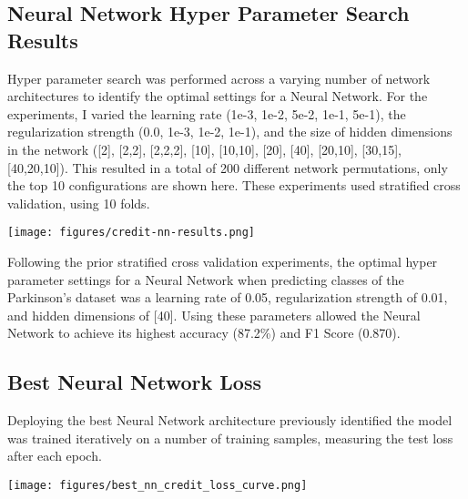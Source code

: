 \documentclass[letterpaper]{article}
\begin{document}
\subsection{Neural Network Hyper Parameter Search Results}

    Hyper parameter search was performed across a varying number of network architectures to identify the optimal settings for a Neural Network. For the experiments, I varied the learning rate (1e-3, 1e-2, 5e-2, 1e-1, 5e-1), the regularization strength (0.0, 1e-3, 1e-2, 1e-1), and the size of hidden dimensions in the network ([2], [2,2], [2,2,2], [10], [10,10], [20], [40], [20,10], [30,15], [40,20,10]). This resulted in a total of 200 different network permutations, only the top 10 configurations are shown here. These experiments used stratified cross validation, using 10 folds.


     \vspace{0.2in}
        \begin{minipage}{\linewidth}
            \centering
            \texttt{[image: figures/credit-nn-results.png]}
        \end{minipage}
    \vspace{0.1in}
    
Following the prior stratified cross validation experiments, the optimal hyper parameter settings for  a Neural Network when predicting classes of the Parkinson's dataset was a learning rate of 0.05, regularization strength of 0.01, and hidden dimensions of [40]. Using these parameters allowed the Neural Network to achieve its highest accuracy (87.2\%) and F1 Score (0.870).

\clearpage
\subsection*{Best Neural Network Loss}

Deploying the best Neural Network architecture previously identified the model was trained iteratively on a number of training samples, measuring the test loss after each epoch.

\vspace{0.2in}
    \begin{minipage}{\linewidth}
        \centering
        \texttt{[image: figures/best\_nn\_credit\_loss\_curve.png]}
    \end{minipage}
\vspace{0.1in}
\end{document}
